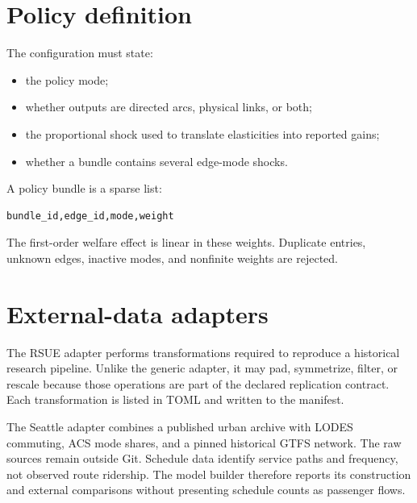 \section{Policy definition}

The configuration must state:
\begin{itemize}
  \item the policy mode;
  \item whether outputs are directed arcs, physical links, or both;
  \item the proportional shock used to translate elasticities into reported
  gains;
  \item whether a bundle contains several edge-mode shocks.
\end{itemize}

A policy bundle is a sparse list:
\begin{lstlisting}
bundle_id,edge_id,mode,weight
\end{lstlisting}
The first-order welfare effect is linear in these weights. Duplicate entries,
unknown edges, inactive modes, and nonfinite weights are rejected.

\section{External-data adapters}

The RSUE adapter performs transformations required to reproduce a historical
research pipeline. Unlike the generic adapter, it may pad, symmetrize, filter,
or rescale because those operations are part of the declared replication
contract. Each transformation is listed in TOML and written to the manifest.

The Seattle adapter combines a published urban archive with LODES commuting,
ACS mode shares, and a pinned historical GTFS network. The raw sources remain
outside Git. Schedule data identify service paths and frequency, not observed
route ridership. The model builder therefore reports its construction and
external comparisons without presenting schedule counts as passenger flows.

